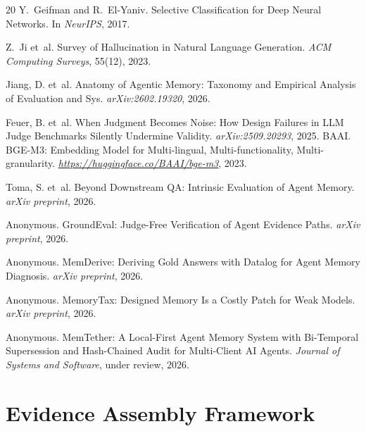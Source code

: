 \documentclass[10pt]{article}
\begin{document}
\begin{thebibliography}{20}
Y.~Geifman and R.~El-Yaniv.
\newblock Selective Classification for Deep Neural Networks.
\newblock In \emph{NeurIPS}, 2017.

Z.~Ji et~al.
\newblock Survey of Hallucination in Natural Language Generation.
\newblock \emph{ACM Computing Surveys}, 55(12), 2023.

Jiang, D. et~al.
\newblock Anatomy of Agentic Memory: Taxonomy and Empirical Analysis of Evaluation and Sys. \newblock \emph{arXiv:2602.19320}, 2026.

Feuer, B. et~al.
\newblock When Judgment Becomes Noise: How Design Failures in LLM Judge Benchmarks Silently Undermine Validity.
\newblock \emph{arXiv:2509.20293}, 2025.
BAAI.
\newblock BGE-M3: Embedding Model for Multi-lingual, Multi-functionality, Multi-granularity.
\newblock \emph{\url{https://huggingface.co/BAAI/bge-m3}}, 2023.


Toma, S. et~al.
\newblock Beyond Downstream QA: Intrinsic Evaluation of Agent Memory.
\newblock \emph{arXiv preprint}, 2026.

Anonymous.
\newblock GroundEval: Judge-Free Verification of Agent Evidence Paths.
\newblock \emph{arXiv preprint}, 2026.

Anonymous.
\newblock MemDerive: Deriving Gold Answers with Datalog for Agent Memory Diagnosis.
\newblock \emph{arXiv preprint}, 2026.

Anonymous.
\newblock MemoryTax: Designed Memory Is a Costly Patch for Weak Models.
\newblock \emph{arXiv preprint}, 2026.


Anonymous.
\newblock MemTether: A Local-First Agent Memory System with Bi-Temporal Supersession and Hash-Chained Audit for Multi-Client AI Agents.
\newblock \emph{Journal of Systems and Software}, under review, 2026.

\end{thebibliography}
\appendix

\section{Evidence Assembly Framework}
\label{sec:eaf-app}
\end{document}
